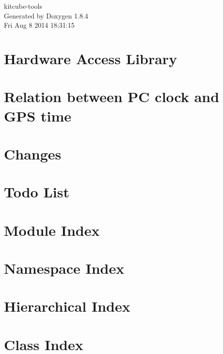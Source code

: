 \documentclass[twoside]{book}
\newcommand{\clearemptydoublepage}{%
  \newpage{\pagestyle{empty}\cleardoublepage}%
}
\begin{document}
\hypersetup{pageanchor=false}
\begin{titlepage}
\vspace*{7cm}
\begin{center}%
{\Large kitcube-\/tools }\\
\vspace*{1cm}
{\large Generated by Doxygen 1.8.4}\\
\vspace*{0.5cm}
{\small Fri Aug 8 2014 18:31:15}\\
\end{center}
\end{titlepage}
\clearemptydoublepage
\tableofcontents
\clearemptydoublepage
{}
\hypersetup{pageanchor=true}

\chapter{Hardware Access Library}
\label{index}\hypertarget{index}{}
\chapter{Relation between P\-C clock and G\-P\-S time}
\label{timesync}
\hypertarget{timesync}{}

\chapter{Changes}
\label{changes}
\hypertarget{changes}{}

\chapter{Todo List}
\label{todo}
\hypertarget{todo}{}

\chapter{Module Index}

\chapter{Namespace Index}

\chapter{Hierarchical Index}

\chapter{Class Index}

\end{document}
